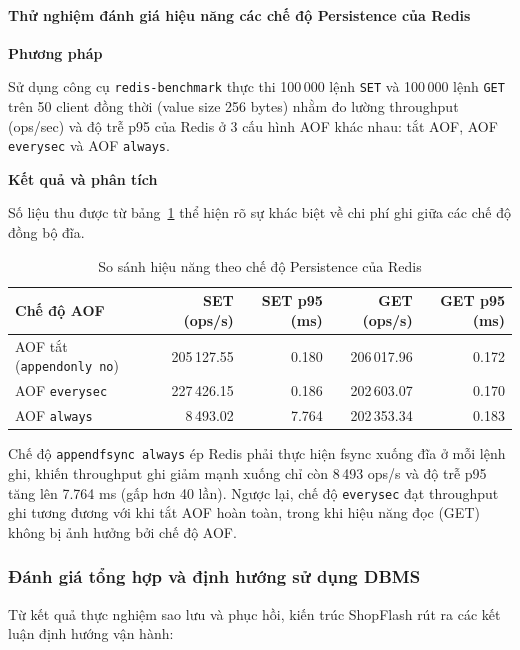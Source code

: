 \paragraph{Thử nghiệm đánh giá hiệu năng các chế độ Persistence của Redis}

\noindent\textbf{Phương pháp}\par
Sử dụng công cụ \texttt{redis-benchmark} \cite{redisBenchmark} thực thi 100\,000 lệnh \texttt{SET} và 100\,000 lệnh \texttt{GET} trên 50 client đồng thời (value size 256 bytes) nhằm đo lường throughput (ops/sec) và độ trễ p95 của Redis ở 3 cấu hình AOF khác nhau: tắt AOF, AOF \texttt{everysec} và AOF \texttt{always}.

\noindent\textbf{Kết quả và phân tích}\par
Số liệu thu được từ bảng~\ref{tab:bk-redis-persistence-benchmark} thể hiện rõ sự khác biệt về chi phí ghi giữa các chế độ đồng bộ đĩa.

\begin{table}[H]
    \centering
    \caption{So sánh hiệu năng theo chế độ Persistence của Redis}
    \label{tab:bk-redis-persistence-benchmark}
    \begin{tabularx}{\textwidth}{@{}Xrrrr@{}}
        \toprule
        Chế độ AOF & SET (ops/s) & SET p95 (ms) & GET (ops/s) & GET p95 (ms) \\
        \midrule
        AOF tắt (\texttt{appendonly no}) & 205\,127.55 & 0.180 & 206\,017.96 & 0.172 \\
        AOF \texttt{everysec} & 227\,426.15 & 0.186 & 202\,603.07 & 0.170 \\
        AOF \texttt{always} & 8\,493.02 & 7.764 & 202\,353.34 & 0.183 \\
        \bottomrule
    \end{tabularx}
\end{table}

Chế độ \texttt{appendfsync always} ép Redis phải thực hiện fsync xuống đĩa ở mỗi lệnh ghi, khiến throughput ghi giảm mạnh xuống chỉ còn 8\,493 ops/s và độ trễ p95 tăng lên 7.764 ms (gấp hơn 40 lần). Ngược lại, chế độ \texttt{everysec} đạt throughput ghi tương đương với khi tắt AOF hoàn toàn, trong khi hiệu năng đọc (GET) không bị ảnh hưởng bởi chế độ AOF.

\subsubsection{Đánh giá tổng hợp và định hướng sử dụng DBMS}

Từ kết quả thực nghiệm sao lưu và phục hồi, kiến trúc ShopFlash rút ra các kết luận định hướng vận hành:

